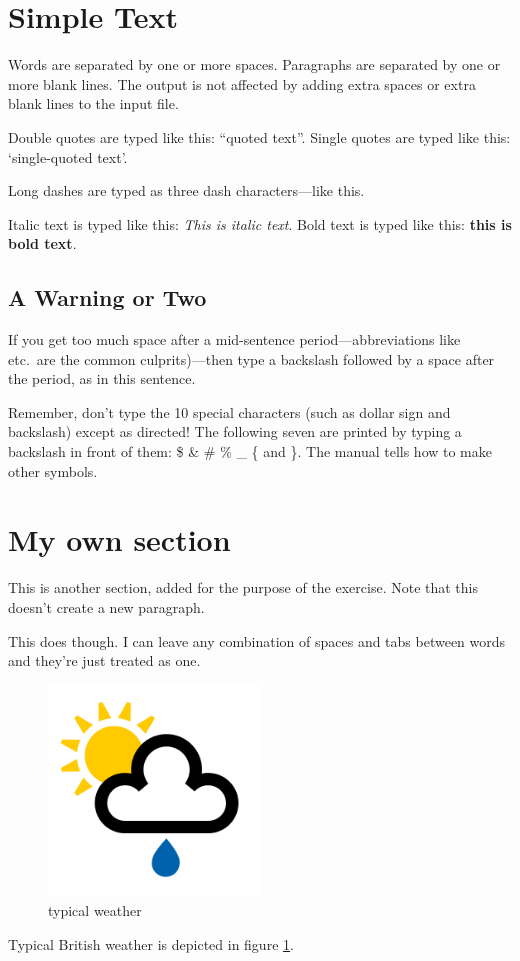 \documentclass[12pt]{article}  %
\begin{document}
\tableofcontents

\section{Simple Text}          %

Words are separated by one or    more      spaces.  Paragraphs are
    separated by one or more blank lines.  The output is not affected
by adding extra spaces or extra blank lines to the input file.


Double quotes are typed like this: ``quoted text''.
Single quotes are typed like this: `single-quoted text'.

Long dashes are typed as three dash characters---like this.

Italic text is typed like this: \textit{This is italic text}.
Bold   text is typed like this: \textbf{this is  bold  text}.

\subsection{A Warning or Two}        %

If you get too much space after a mid-sentence period---abbreviations
like etc.\ are the common culprits)---then type a backslash followed by
a space after the period, as in this sentence.

Remember, don't type the 10 special characters (such as dollar sign and
backslash) except as directed!  The following seven are printed by
typing a backslash in front of them:  \$  \&  \#  \%  \_  \{  and  \}.
The manual tells how to make other symbols.

\section{My own section}
This is another section, added for the purpose of the exercise.
Note that this doesn't create a new paragraph.

This does though.	I can leave any  combination of spaces and tabs
between words and they're just treated as one.

\begin{figure}
	\centering
	\includegraphics[width=0.5\textwidth]{showers}
	\caption{typical weather}
	\label{fig:weather}
\end{figure}

Typical British weather is depicted in figure \ref{fig:weather}.
\end{document}
